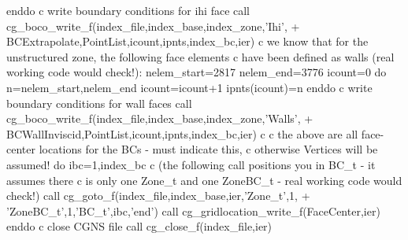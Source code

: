 \documentclass[12pt]{article}
\begin{document}
{\newline\indent      enddo
\newline c  write boundary conditions for ihi face
\newline\indent      call cg\_boco\_write\_f(index\_file,index\_base,index\_zone,'Ihi',
\newline + \indent BCExtrapolate,PointList,icount,ipnts,index\_bc,ier)
\newline c  we know that for the unstructured zone, the following face elements
\newline c  have been defined as walls (real working code would check!):
\newline\indent      nelem\_start=2817
\newline\indent      nelem\_end=3776
\newline\indent      icount=0
\newline\indent      do n=nelem\_start,nelem\_end
\newline\indent\indent        icount=icount+1
\newline\indent\indent        ipnts(icount)=n
\newline\indent      enddo
\newline c  write boundary conditions for wall faces
\newline\indent      call cg\_boco\_write\_f(index\_file,index\_base,index\_zone,'Walls',
\newline + \indent BCWallInviscid,PointList,icount,ipnts,index\_bc,ier)
\newline c
\newline c  the above are all face-center locations for the BCs - must indicate this,
\newline c  otherwise Vertices will be assumed!
\newline\indent      do ibc=1,index\_bc
\newline c  (the following call positions you in BC\_t - it assumes there
\newline c  is only one Zone\_t and one ZoneBC\_t - real working code would check!)
\newline\indent\indent        call cg\_goto\_f(index\_file,index\_base,ier,'Zone\_t',1,
\newline + \indent\indent    'ZoneBC\_t',1,'BC\_t',ibc,'end')
\newline\indent\indent        call cg\_gridlocation\_write\_f(FaceCenter,ier)
\newline\indent      enddo
\newline c  close CGNS file
\newline\indent      call cg\_close\_f(index\_file,ier)
}
\end{document}
